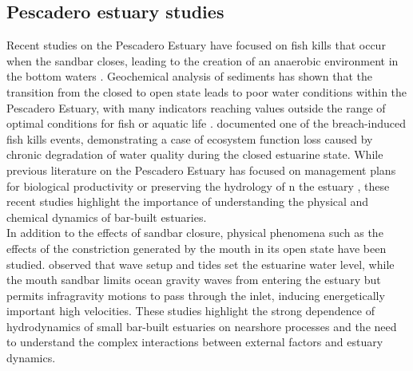 \documentclass[tesis.tex]{subfiles}
\begin{document}
\subsection{Pescadero estuary studies}

Recent studies on the Pescadero Estuary have focused on fish kills that occur when the sandbar closes, leading to the creation of an anaerobic environment in the bottom waters \citep{sloan2006ecological}. Geochemical analysis of sediments has shown that the transition from the closed to open state leads to poor water conditions within the Pescadero Estuary, with many indicators reaching values outside the range of optimal conditions for fish or aquatic life \citep{richards2018}. \cite{huber2020environmental} documented one of the breach-induced fish kills events, demonstrating a case of ecosystem function loss caused by chronic degradation of water quality during the closed estuarine state. While previous literature on the Pescadero Estuary has focused on management plans for biological productivity \citep{curry1985pescadero} or preserving the hydrology of n the estuary \citep{williams1990pescadero}, these recent studies highlight the importance of understanding the physical and chemical dynamics of bar-built estuaries.\\

In addition to the effects of sandbar closure, physical phenomena such as the effects of the constriction generated by the mouth in its open state have been studied. \cite{williams2016} observed that wave setup and tides set the estuarine water level, while the mouth sandbar limits ocean gravity waves from entering the estuary but permits infragravity motions to pass through the inlet, inducing energetically important high velocities. These studies highlight the strong dependence of hydrodynamics of small bar-built estuaries on nearshore processes and the need to understand the complex interactions between external factors and estuary dynamics.\\
\end{document}
